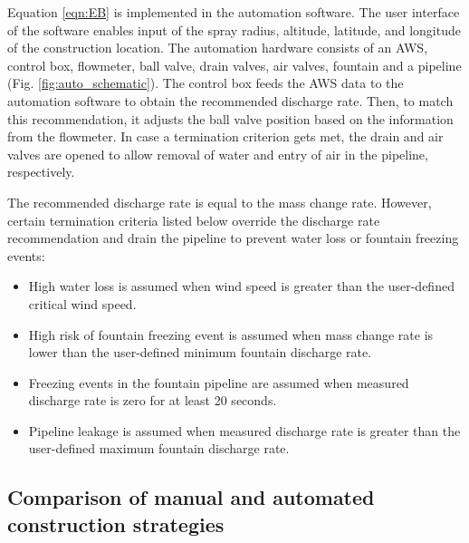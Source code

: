 Equation \ref{eqn:EB} is implemented in the automation software. The user interface of the software enables
input of the spray radius, altitude, latitude, and longitude of the construction location. The automation
hardware consists of an \ac{AWS}, control box, flowmeter, ball valve, drain valves, air valves, fountain and a
pipeline (Fig. \ref{fig:auto_schematic}). The control box feeds the AWS data to the automation software to
obtain the recommended discharge rate. Then, to match this recommendation, it adjusts the ball valve position
based on the information from the flowmeter. In case a termination criterion gets met, the drain and air valves
are opened to allow removal of water and entry of air in the pipeline, respectively.

The recommended discharge rate is equal to the mass change rate. However, certain termination criteria listed
below override the discharge rate recommendation and drain the pipeline to prevent water loss or fountain
freezing events:

\begin{itemize}

	\item High water loss is assumed when wind speed is greater than the user-defined critical wind speed.

	\item High risk of fountain freezing event is assumed when mass change rate is lower than the user-defined minimum fountain discharge rate.

	\item Freezing events in the fountain pipeline are assumed when measured discharge rate is zero for at least
    20 seconds.

	\item Pipeline leakage is assumed when measured discharge rate is greater than the user-defined maximum fountain discharge rate.

\end{itemize}

\subsection{Comparison of manual and automated construction strategies}

